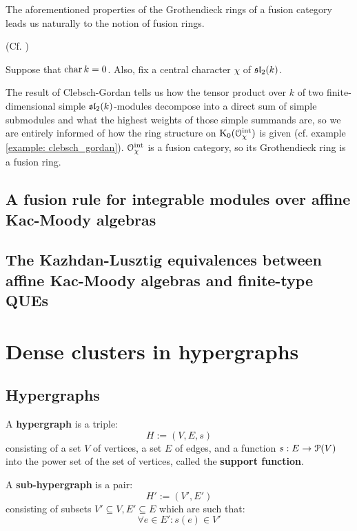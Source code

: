             The aforementioned properties of the Grothendieck rings of a fusion category leads us naturally to the notion of fusion rings.
            \begin{definition}
                (Cf. \cite[Subsection 3.1]{EGNO})
            \end{definition}
            \begin{example}
                Suppose that $\chara k = 0$. Also, fix a central character $\chi$ of $\sl_2(k)$.
            
                The result of Clebsch-Gordan tells us how the tensor product over $k$ of two finite-dimensional simple $\sl_2(k)$-modules decompose into a direct sum of simple submodules and what the highest weights of those simple summands are, so we are entirely informed of how the ring structure on $\K_0(\calO_{\chi}^{\integrable})$ is given (cf. example \ref{example: clebsch_gordan}). $\calO_{\chi}^{\integrable}$ is a fusion category, so its Grothendieck ring is a fusion ring.
                
            \end{example}

        \subsection{A fusion rule for integrable modules over affine Kac-Moody algebras}

        \subsection{The Kazhdan-Lusztig equivalences between affine Kac-Moody algebras and finite-type QUEs}

    \section{Dense clusters in hypergraphs}
        \subsection{Hypergraphs}
            \begin{definition}[Hypergraphs] \label{def: hypergraphs}
                A \textbf{hypergraph} is a triple:
                    $$H := (V, E, s)$$
                consisting of a set $V$ of vertices, a set $E$ of edges, and a function $s: E \to \calP(V)$ into the power set of the set of vertices, called the \textbf{support function}.

                A \textbf{sub-hypergraph} is a pair:
                    $$H' := (V', E')$$
                consisting of subsets $V' \subseteq V, E' \subseteq E$ which are such that:
                    $$\forall e \in E': s(e) \in V'$$
            \end{definition}


